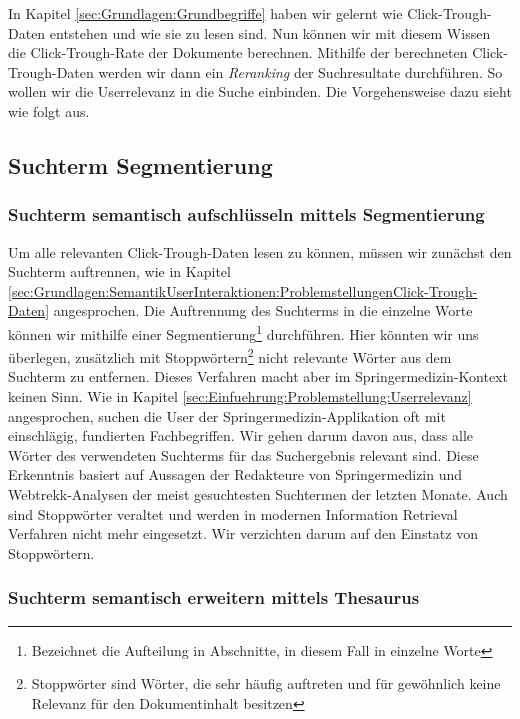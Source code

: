 In Kapitel \ref{sec:Grundlagen:Grundbegriffe} haben wir gelernt wie Click-Trough-Daten entstehen und wie sie zu lesen sind. Nun können wir mit diesem Wissen die Click-Trough-Rate der Dokumente berechnen. Mithilfe der berechneten Click-Trough-Daten werden wir dann ein \textit{Reranking} der Suchresultate durchführen. So wollen wir die Userrelevanz in die Suche einbinden. Die Vorgehensweise dazu sieht wie folgt aus.

\subsection{Suchterm Segmentierung}
\label{sec:Reranking:Methodik:SuchtermSegmentierung}

\subsubsection{Suchterm semantisch aufschlüsseln mittels Segmentierung}
\label{sec:Reranking:Methodik:SuchtermSegmentierung:SuchtermSegmentierung}

Um alle relevanten Click-Trough-Daten lesen zu können, müssen wir zunächst den Suchterm auftrennen, wie in Kapitel \ref{sec:Grundlagen:SemantikUserInteraktionen:ProblemstellungenClick-Trough-Daten} angesprochen. Die Auftrennung des Suchterms in die einzelne Worte können wir mithilfe einer Segmentierung\footnote{Bezeichnet die Aufteilung in Abschnitte, in diesem Fall in einzelne Worte} durchführen. Hier könnten wir uns überlegen, zusätzlich mit Stoppwörtern\footnote{Stoppwörter sind Wörter, die sehr häufig auftreten und für gewöhnlich keine Relevanz für den Dokumentinhalt besitzen} nicht relevante Wörter aus dem Suchterm zu entfernen. Dieses Verfahren macht aber im Springermedizin-Kontext keinen Sinn. Wie in Kapitel \ref{sec:Einfuehrung:Problemstellung:Userrelevanz} angesprochen, suchen die User der Springermedizin-Applikation oft mit einschlägig, fundierten Fachbegriffen. Wir gehen darum davon aus, dass alle Wörter des verwendeten Suchterms für das Suchergebnis relevant sind. Diese Erkenntnis basiert auf Aussagen der Redakteure von Springermedizin und Webtrekk-Analysen der meist gesuchtesten Suchtermen der letzten Monate. Auch sind Stoppwörter veraltet und werden in modernen Information Retrieval Verfahren nicht mehr eingesetzt. Wir verzichten darum auf den Einstatz von Stoppwörtern.

\subsubsection{Suchterm semantisch erweitern mittels Thesaurus}
\label{sec:Reranking:Methodik:SuchtermSegmentierung:SuchtermThesaurus}

